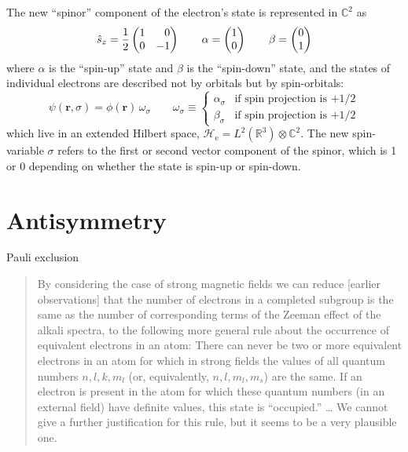The new ``spinor'' component of the electron's state is represented in
\(\mathbb{C}^2\) as
\begin{equation}
    \hat{s}_z
    =
    \frac{1}{2}
    \begin{pmatrix}
        1 & \hphantom{+}0 \\
        0 & -1
    \end{pmatrix}
    \qquad
    \alpha
    =
    \begin{pmatrix}
        1 \\ 0
    \end{pmatrix}
    \qquad
    \beta
    =
    \begin{pmatrix}
        0 \\ 1
    \end{pmatrix}
\end{equation}
where \(\alpha\) is the ``spin-up'' state and \(\beta\) is the
``spin-down'' state, and the states of individual electrons are described not by
orbitals but by spin-orbitals:
\begin{equation}
    \psi(\mathbf{r}, \sigma)
    =
    \phi(\mathbf{r})\,
    \omega_\sigma
    \qquad
    \omega_\sigma
    \equiv
    \left\{
        \begin{array}{cl}
            \alpha_{\sigma}
            &
            \text{if spin projection is \(+1/2\)}
            \\[10pt]
            \beta_{\sigma}
            &
            \text{if spin projection is \(+1/2\)}
        \end{array}
    \right.
\end{equation}
which live in an extended Hilbert space,
\(
    \mathcal{H}_\mathrm{e}
    =
    L^2(\mathbb{R}^3)
    \otimes
    \mathbb{C}^2
\).
The new spin-variable \(\sigma\) refers to the first or second vector component
of the spinor, which is 1 or 0 depending on whether the state is spin-up or
spin-down.


\section{Antisymmetry}


\noindent
Pauli exclusion\cite{Pauli:1925p756}
\begin{quote}
    By considering the case of strong magnetic fields we can reduce [earlier
    observations] that the number of electrons in a completed subgroup is the
    same as the number of corresponding terms of the Zeeman effect of the alkali
    spectra, to the following more general rule about the occurrence of
    equivalent electrons in an atom:
    There can never be two or more equivalent electrons in an atom for which in
    strong fields the values of all quantum numbers \(n, l, k, m_l\) (or,
    equivalently, \(n, l, m_l, m_s\)) are the same.
    If an electron is present in the atom for which these quantum numbers (in an
    external field) have definite values, this state is ``occupied.''
    \dots
    We cannot give a further justification for this rule, but it seems to be a
    very plausible one.
\end{quote}

